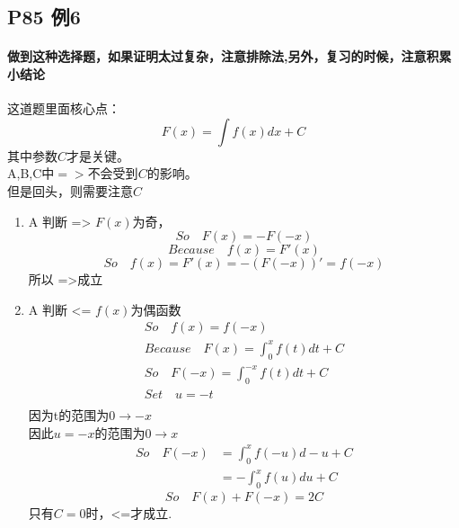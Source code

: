 \documentclass[a4paper]{ctexart}
\begin{document}
\begin{multicols}{2}
    \section{P85 例6}
    \paragraph{做到这种选择题，如果证明太过复杂，注意排除法,另外，复习的时候，注意积累小结论}
    这道题里面核心点：
    $$
    F(x) = \int{f(x)dx} + C
    $$
    其中参数$C$才是关键。\\
    A,B,C中$=>$不会受到$C$的影响。\\
    但是回头，则需要注意$C$
    \begin{enumerate}
        \item A \quad 判断 =>
        $F(x)$为奇，
        $$
        So \quad F(x) = -F(-x)
        $$
        $$
        Because \quad f(x) = F'(x)
        $$
        $$
        So \quad f(x) = F'(x) = -(F(-x))' = f(-x)
        $$
        所以 =>成立\\

        \item A \quad 判断 <=
        $f(x)$为偶函数
        $$
        \begin{array}{l}
        So \quad f(x) = f(-x)\\
        Because \quad F(x) = \int_{0}^{x}{f(t)dt} + C\\
        So \quad F(-x)  = \int_{0}^{-x}{f(t)dt} + C\\
        Set \quad u = -t\\
        \end{array}
        $$
        因为t的范围为$0 \rightarrow -x$\\
        因此$u=-x$的范围为$0 \rightarrow x$\\
        $$
        \begin{array}{ll}
        So \quad F(-x) & = \int_{0}^{x}{f(-u)d-u} + C\\
                        & = -\int_{0}^{x}{f(u)du} + C
        \end{array}
        $$
        $$
        So \quad F(x) + F(-x) = 2C
        $$
        只有$C=0$时，<=才成立.


\end{enumerate}
\end{multicols}
\end{document}

